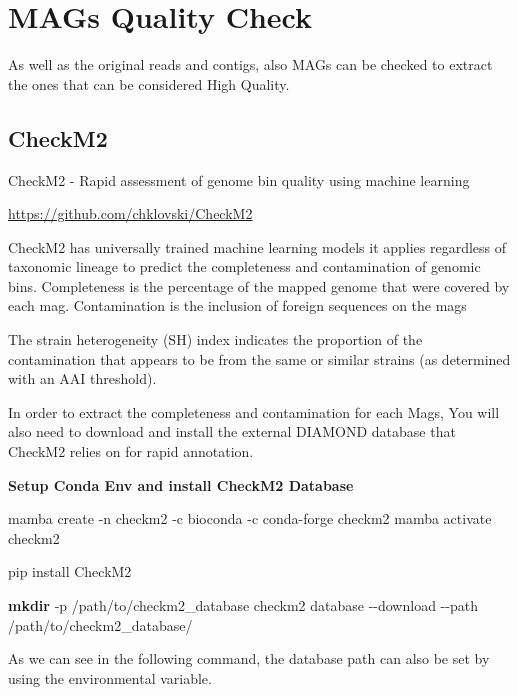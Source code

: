 \documentclass[
]{book}
\newenvironment{Shaded}{\begin{snugshade}}{\end{snugshade}}
\newcommand{\AttributeTok}[1]{\textcolor[rgb]{0.13,0.29,0.53}{#1}}
\newcommand{\ExtensionTok}[1]{#1}
\newcommand{\FunctionTok}[1]{\textcolor[rgb]{0.13,0.29,0.53}{\textbf{#1}}}
\newcommand{\NormalTok}[1]{#1}
\begin{document}
\section{MAGs Quality Check}\label{mags-quality-check}

As well as the original reads and contigs, also MAGs can be checked to extract the ones that can be considered High Quality.

\subsection{CheckM2}\label{checkm2}

CheckM2 - Rapid assessment of genome bin quality using machine learning

\url{https://github.com/chklovski/CheckM2}

CheckM2 has universally trained machine learning models it applies regardless of taxonomic lineage to predict the completeness and contamination of genomic bins.
Completeness is the percentage of the mapped genome that were covered by each mag.
Contamination is the inclusion of foreign sequences on the mags

The strain heterogeneity (SH) index indicates the proportion of the contamination that appears to be from the same or similar strains (as determined with an AAI threshold).

In order to extract the completeness and contamination for each Mags, You will also need to download and install the external DIAMOND database that CheckM2 relies on for rapid annotation.

\textbf{Setup Conda Env and install CheckM2 Database}

\begin{Shaded}
\begin{Highlighting}[]
\ExtensionTok{mamba}\NormalTok{ create }\AttributeTok{{-}n}\NormalTok{ checkm2 }\AttributeTok{{-}c}\NormalTok{ bioconda }\AttributeTok{{-}c}\NormalTok{ conda{-}forge checkm2}
\ExtensionTok{mamba}\NormalTok{ activate checkm2}

\ExtensionTok{pip}\NormalTok{ install CheckM2}

\FunctionTok{mkdir} \AttributeTok{{-}p}\NormalTok{ /path/to/checkm2\_database}
\ExtensionTok{checkm2}\NormalTok{ database }\AttributeTok{{-}{-}download} \AttributeTok{{-}{-}path}\NormalTok{ /path/to/checkm2\_database/}
\end{Highlighting}
\end{Shaded}

As we can see in the following command, the database path can also be set by using the environmental variable.
\end{document}
